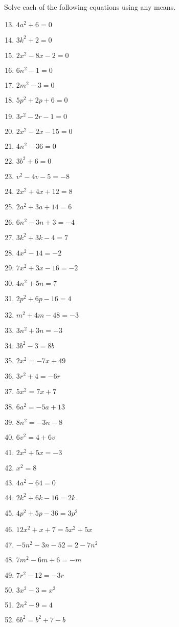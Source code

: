 \documentclass[12pt]{article}
\theoremstyle{definition}
\begin{document}
Solve each of the following equations using any means.
\begin{multicols}{3}
\begin{enumerate}
\setcounter{enumi}{12}
  \item $4 a^2 + 6 = 0$
  \item $3 k^2 + 2 = 0$
  \item $2 x^2 - 8 x - 2 = 0$
  \item $6 n^2 - 1 = 0$
  \item $2 m^2 - 3 = 0$
  \item $5 p^2 + 2 p + 6 = 0$
  \item $3 r^2 - 2 r - 1 = 0$
  \item $2 x^2 - 2 x - 15 = 0$
  \item $4 n^2 - 36 = 0$
  \item $3 b^2 + 6 = 0$
  \item $v^2 - 4 v - 5 = - 8$
  \item $2 x^2 + 4 x + 12 = 8$
  \item $2 a^2 + 3 a + 14 = 6$
  \item $6 n^2 - 3 n + 3 = - 4$
  \item $3 k^2 + 3 k - 4 = 7$
  \item $4 x^2 - 14 = - 2$
  \item $7 x^2 + 3 x - 16 = - 2$
  \item $4 n^2 + 5 n = 7$
  \item $2 p^2 + 6 p - 16 = 4$
  \item $m^2 + 4 m - 48 = - 3$
  \item $3 n^2 + 3 n = - 3$
  \item $3 b^2 - 3 = 8 b$
  \item $2 x^2 = - 7 x + 49$
  \item $3 r^2 + 4 = - 6 r$
  \item $5 x^2 = 7 x + 7$
  \item $6 a^2 = - 5 a + 13$
  \item $8 n^2 = - 3 n - 8$
  \item $6 v^2 = 4 + 6 v$
  \item $2 x^2 + 5 x = - 3$
  \item $x^2 = 8$
  \item $4 a^2 - 64 = 0$
  \item $2 k^2 + 6 k - 16 = 2 k$
  \item $4 p^2 + 5 p - 36 = 3 p^2$
  \item $12 x^2 + x + 7 = 5 x^2 + 5 x$
  \item $- 5 n^2 - 3 n - 52 = 2 - 7 n^2$
  \item $7 m^2 - 6 m + 6 = - m$
  \item $7 r^2 - 12 = - 3 r$
  \item $3 x^2 - 3 = x^2$
  \item $2 n^2 - 9 = 4$
  \item $6 b^2 = b^2 + 7 - b$
\end{enumerate}
\end{multicols}
\newpage
\end{document}
